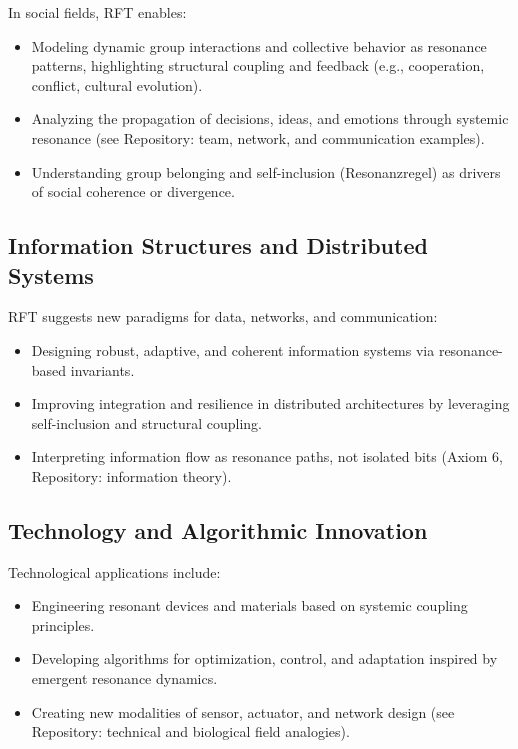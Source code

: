 \documentclass[12pt]{article}
\begin{document}
	In social fields, RFT enables:
	\begin{itemize}
		\item Modeling dynamic group interactions and collective behavior as resonance patterns, highlighting structural coupling and feedback (e.g., cooperation, conflict, cultural evolution).
		\item Analyzing the propagation of decisions, ideas, and emotions through systemic resonance (see Repository: team, network, and communication examples).
		\item Understanding group belonging and self-inclusion (Resonanzregel) as drivers of social coherence or divergence.
	\end{itemize}
	
	\subsection{Information Structures and Distributed Systems}
	
	RFT suggests new paradigms for data, networks, and communication:
	\begin{itemize}
		\item Designing robust, adaptive, and coherent information systems via resonance-based invariants.
		\item Improving integration and resilience in distributed architectures by leveraging self-inclusion and structural coupling.
		\item Interpreting information flow as resonance paths, not isolated bits (Axiom 6, Repository: information theory).
	\end{itemize}
	
	\subsection{Technology and Algorithmic Innovation}
	
	Technological applications include:
	\begin{itemize}
		\item Engineering resonant devices and materials based on systemic coupling principles.
		\item Developing algorithms for optimization, control, and adaptation inspired by emergent resonance dynamics.
		\item Creating new modalities of sensor, actuator, and network design (see Repository: technical and biological field analogies).
	\end{itemize}
	
\end{document}
